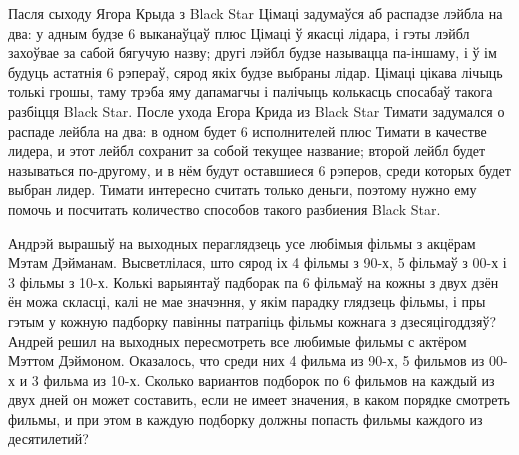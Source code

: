 \documentclass[11pt,twoside]{article}
\begin{document}
\begin{problemList}
\bigskip

\problemItemSimple
{Пасля сыходу Ягора Крыда з Black Star Цімаці задумаўся аб распадзе лэйбла на два:
у адным будзе 6 выканаўцаў плюс Цімаці ў якасці лідара, і гэты лэйбл захоўвае за сабой бягучую назву;
другі лэйбл будзе называцца па-іншаму, і ў ім будуць астатнія 6 рэпераў, сярод якіх будзе выбраны лідар.
Цімаці цікава лічыць толькі грошы, таму трэба яму дапамагчы і палічыць колькасць спосабаў такога разбіцця Black Star.}
{После ухода Егора Крида из Black Star Тимати задумался о распаде лейбла на два:
в одном будет 6 исполнителей плюс Тимати в качестве лидера, и этот лейбл сохранит за собой текущее название;
второй лейбл будет называться по-другому, и в нём будут оставшиеся 6 рэперов, среди которых будет выбран лидер.
Тимати интересно считать только деньги, поэтому нужно ему помочь и посчитать количество способов такого разбиения Black Star.}

\bigskip

\problemItemSimple
{Андрэй вырашыў на выходных пераглядзець усе любімыя фільмы з акцёрам Мэтам Дэйманам.
Высветлілася, што сярод іх 4 фільмы з 90-х, 5 фільмаў з 00-х і 3 фільмы з 10-х.
Колькі варыянтаў падборак па 6 фільмаў на кожны з двух дзён ён можа скласці,
калі не мае значэння, у якім парадку глядзець фільмы,
і пры гэтым у кожную падборку павінны патрапіць фільмы кожнага з дзесяцігоддзяў?}
{Андрей решил на выходных пересмотреть все любимые фильмы с актёром Мэттом Дэймоном.
Оказалось, что среди них 4 фильма из 90-х, 5 фильмов из 00-х и 3 фильма из 10-х.
Сколько вариантов подборок по 6 фильмов на каждый из двух дней он может составить,
если не имеет значения, в каком порядке смотреть фильмы,
и при этом в каждую подборку должны попасть фильмы каждого из десятилетий?}

\end{problemList}
\end{document}
